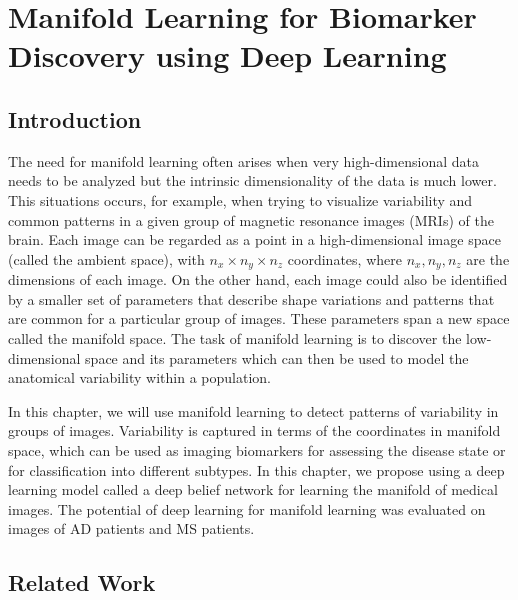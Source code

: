 \chapter{Manifold Learning for Biomarker Discovery using Deep Learning}
\label{sec:manifold}

\section{Introduction}


The need for manifold learning often arises when very high-dimensional data
needs to be analyzed but the intrinsic dimensionality of the data is much lower.
This situations occurs, for example, when trying to visualize variability and
common patterns in a given group of magnetic resonance images (MRIs) of the
brain. Each image can be regarded as a point in a high-dimensional image space
(called the ambient space), with $n_x \times n_y \times n_z$ coordinates, where
$n_x, n_y, n_z$ are the dimensions of each image. On the other hand, each image
could also be identified by a smaller set of parameters that describe shape
variations and patterns that are common for a particular group of images. These
parameters span a new space called the manifold space. The task of manifold
learning is to discover the low-dimensional space and its parameters which can
then be used to model the anatomical variability within a population.

In this chapter, we will use manifold learning to detect patterns of variability
in groups of images. Variability is captured in terms of the coordinates in
manifold space, which can be used as imaging biomarkers for assessing the
disease state or for classification into different subtypes. In this chapter, we
propose using a deep learning model called a deep belief network for learning
the manifold of medical images. The potential of deep learning for manifold
learning was evaluated on images of AD patients and MS patients.

\section{Related Work}

